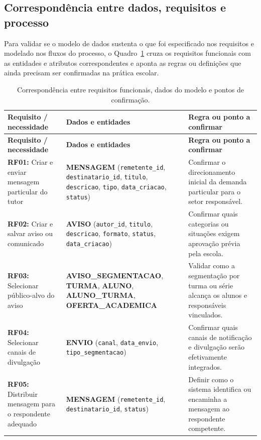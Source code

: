 \documentclass[a4paper,12pt]{report}
\begin{document}
\subsection{Correspondência entre dados, requisitos e processo}

Para validar se o modelo de dados sustenta o que foi especificado nos requisitos e modelado nos fluxos do processo, o Quadro~\ref{tab:correspondencia-mer} cruza os requisitos funcionais com as entidades e atributos correspondentes e aponta as regras ou definições que ainda precisam ser confirmadas na prática escolar.

\begin{longtable}{|p{3.4cm}|p{4.8cm}|p{6.4cm}|}
\caption{Correspondência entre requisitos funcionais, dados do modelo e pontos de confirmação.} \label{tab:correspondencia-mer} \\
\hline
\textbf{Requisito / necessidade} & \textbf{Dados e entidades} & \textbf{Regra ou ponto a confirmar} \\
\hline
\endfirsthead
\hline
\textbf{Requisito / necessidade} & \textbf{Dados e entidades} & \textbf{Regra ou ponto a confirmar} \\
\hline
\endhead
\textbf{RF01:} Criar e enviar mensagem particular do tutor & \textbf{MENSAGEM} (\texttt{remetente\_id}, \texttt{destinatario\_id}, \texttt{titulo}, \texttt{descricao}, \texttt{tipo}, \texttt{data\_criacao}, \texttt{status}) & Confirmar o direcionamento inicial da demanda particular para o setor responsável. \\
\hline
\textbf{RF02:} Criar e salvar aviso ou comunicado & \textbf{AVISO} (\texttt{autor\_id}, \texttt{titulo}, \texttt{descricao}, \texttt{formato}, \texttt{status}, \texttt{data\_criacao}) & Confirmar quais categorias ou situações exigem aprovação prévia pela escola. \\
\hline
\textbf{RF03:} Selecionar público-alvo do aviso & \textbf{AVISO\_SEGMENTACAO}, \textbf{TURMA}, \textbf{ALUNO}, \textbf{ALUNO\_TURMA}, \textbf{OFERTA\_ACADEMICA} & Validar como a segmentação por turma ou série alcança os alunos e responsáveis vinculados. \\
\hline
\textbf{RF04:} Selecionar canais de divulgação & \textbf{ENVIO} (\texttt{canal}, \texttt{data\_envio}, \texttt{tipo\_segmentacao}) & Confirmar quais canais de notificação e divulgação serão efetivamente integrados. \\
\hline
\textbf{RF05:} Distribuir mensagem para o respondente adequado & \textbf{MENSAGEM} (\texttt{remetente\_id}, \texttt{destinatario\_id}, \texttt{status}) & Definir como o sistema identifica ou encaminha a mensagem ao respondente competente. \\

\end{longtable}
\end{document}
